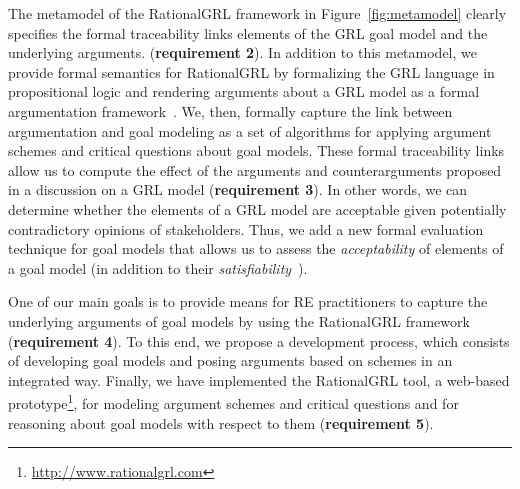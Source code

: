 The metamodel of the RationalGRL framework in Figure~\ref{fig:metamodel} clearly specifies the formal traceability links elements of the GRL goal model and the underlying arguments. (\textbf{requirement 2}). In addition to this metamodel, we provide formal semantics for RationalGRL by formalizing the GRL language in propositional logic and rendering arguments about a GRL model as a formal argumentation framework~\cite{Dung1995}. We, then, formally capture the link between argumentation and goal modeling as a set of algorithms for applying argument schemes and critical questions about goal models. These formal traceability links allow us to compute the effect of the arguments and counterarguments proposed in a discussion on a GRL model (\textbf{requirement 3}). In other words, we can determine whether the elements of a GRL model are acceptable given potentially contradictory opinions of stakeholders. Thus, we add a new formal evaluation technique for goal models that allows us to assess the \emph{acceptability} of elements of a goal model (in addition to their \emph{satisfiability}~\cite{Amyot:2010:EGM:1841349.1841356}).

One of our main goals is to provide means for RE practitioners to capture the underlying arguments of goal models by using the RationalGRL framework (\textbf{requirement 4}). To this end, we propose a development process, which consists of developing goal models and posing arguments based on schemes in an integrated way. Finally, we have implemented the RationalGRL tool, a web-based prototype\footnote{\url{http://www.rationalgrl.com}}, for modeling argument schemes and critical questions and for reasoning about goal models with respect to them (\textbf{requirement 5}). 
